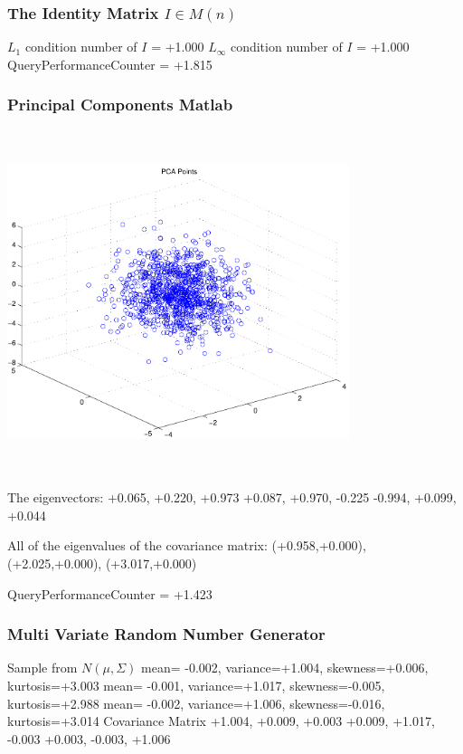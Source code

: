 \documentclass[9pt]{article}
\theoremstyle{plain}
\theoremstyle{definition}
\theoremstyle{remark}
\numberwithin{equation}{section}
\begin{document}
\subsubsection{The Identity Matrix $I \in M(n)$}
$L_1$ condition number of $I$ = +1.000
$L_\infty$ condition number of $I$ = +1.000
QueryPerformanceCounter  =  +1.815
\subsubsection{Principal Components Matlab }
\includegraphics[width=10.0cm,height=10.0cm]{PCAPoints.pdf}

The eigenvectors:
+0.065, +0.220, +0.973
+0.087, +0.970, -0.225
-0.994, +0.099, +0.044

All of the eigenvalues of the covariance matrix:
(+0.958,+0.000), (+2.025,+0.000), (+3.017,+0.000)

QueryPerformanceCounter  =  +1.423
\subsubsection{Multi Variate Random Number Generator }
Sample from $N(\mu,\Sigma)$
mean= -0.002, variance=+1.004, skewness=+0.006, kurtosis=+3.003
mean= -0.001, variance=+1.017, skewness=-0.005, kurtosis=+2.988
mean= -0.002, variance=+1.006, skewness=-0.016, kurtosis=+3.014
Covariance Matrix 
+1.004, +0.009, +0.003
+0.009, +1.017, -0.003
+0.003, -0.003, +1.006
\end{document}
